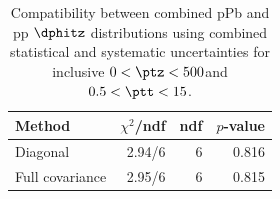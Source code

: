 \begin{table}[htp!]
\centering
\begin{tabular}{|l|r|r|r|}
\hline
Method & $\chi^2$/ndf & ndf & $p$-value \\
\hline
Diagonal & 2.94/6 & 6 & 0.816 \\
Full covariance & 2.95/6 & 6 & 0.815 \\
\hline
\end{tabular}
\caption{Compatibility between combined pPb and pp $\dphitz$ distributions using combined statistical and systematic uncertainties for inclusive $0 < \ptz < 500$\GeV and $0.5 < \ptt < 15$\GeV.}
\label{table:chisq_dphi}
\end{table}
